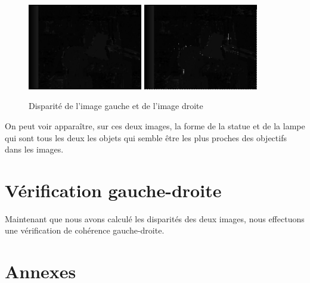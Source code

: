 \documentclass[a4paper,10pt]{article}
\begin{document}
\begin{figure}[!h]
 \centering
 \includegraphics[width=5cm]{leftDisparity.png}
 \includegraphics[width=5cm]{rightDisparity.png}
 \caption{Disparité de l'image gauche et de l'image droite}
\end{figure}
On peut voir apparaître, sur ces deux images, la forme de la statue et de la lampe qui sont
tous les deux les objets qui semble être les plus proches des objectifs dans les images.

\section{Vérification gauche-droite}
Maintenant que nous avons calculé les disparités des deux images, nous effectuons une vérification
de cohérence gauche-droite.
\newpage
\section{Annexes}
\end{document}
